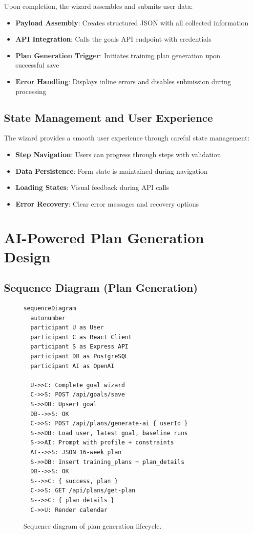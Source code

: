 Upon completion, the wizard assembles and submits user data:

\begin{itemize}
    \item \textbf{Payload Assembly}: Creates structured JSON with all collected information
    \item \textbf{API Integration}: Calls the goals API endpoint with credentials
    \item \textbf{Plan Generation Trigger}: Initiates training plan generation upon successful save
    \item \textbf{Error Handling}: Displays inline errors and disables submission during processing
\end{itemize}

\subsection{State Management and User Experience}

The wizard provides a smooth user experience through careful state management:

\begin{itemize}
    \item \textbf{Step Navigation}: Users can progress through steps with validation
    \item \textbf{Data Persistence}: Form state is maintained during navigation
    \item \textbf{Loading States}: Visual feedback during API calls
    \item \textbf{Error Recovery}: Clear error messages and recovery options
\end{itemize}

\section{AI-Powered Plan Generation Design}

\subsection*{Sequence Diagram (Plan Generation)}
\begin{figure}[h]
\centering
\begin{minipage}{0.95\linewidth}
\begin{verbatim}
sequenceDiagram
  autonumber
  participant U as User
  participant C as React Client
  participant S as Express API
  participant DB as PostgreSQL
  participant AI as OpenAI

  U->>C: Complete goal wizard
  C->>S: POST /api/goals/save
  S->>DB: Upsert goal
  DB-->>S: OK
  C->>S: POST /api/plans/generate-ai { userId }
  S->>DB: Load user, latest goal, baseline runs
  S->>AI: Prompt with profile + constraints
  AI-->>S: JSON 16‑week plan
  S->>DB: Insert training_plans + plan_details
  DB-->>S: OK
  S-->>C: { success, plan }
  C->>S: GET /api/plans/get-plan
  S-->>C: { plan details }
  C->>U: Render calendar
\end{verbatim}
\end{minipage}
\caption{Sequence diagram of plan generation lifecycle.}
\end{figure}


